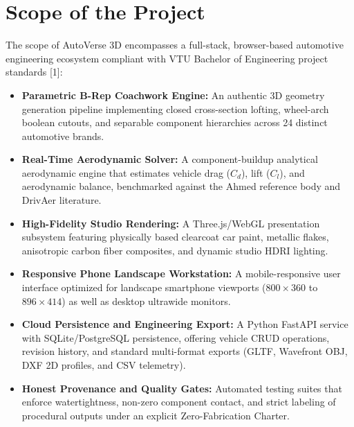 \documentclass[12pt,a4paper]{report}
\begin{document}
\section{Scope of the Project}
The scope of AutoVerse 3D encompasses a full-stack, browser-based automotive engineering ecosystem compliant with VTU Bachelor of Engineering project standards [1]:
\begin{itemize}
    \item \textbf{Parametric B-Rep Coachwork Engine:} An authentic 3D geometry generation pipeline implementing closed cross-section lofting, wheel-arch boolean cutouts, and separable component hierarchies across 24 distinct automotive brands.
    \item \textbf{Real-Time Aerodynamic Solver:} A component-buildup analytical aerodynamic engine that estimates vehicle drag ($C_d$), lift ($C_l$), and aerodynamic balance, benchmarked against the Ahmed reference body and DrivAer literature.
    \item \textbf{High-Fidelity Studio Rendering:} A Three.js/WebGL presentation subsystem featuring physically based clearcoat car paint, metallic flakes, anisotropic carbon fiber composites, and dynamic studio HDRI lighting.
    \item \textbf{Responsive Phone Landscape Workstation:} A mobile-responsive user interface optimized for landscape smartphone viewports ($800\times360$ to $896\times414$) as well as desktop ultrawide monitors.
    \item \textbf{Cloud Persistence and Engineering Export:} A Python FastAPI service with SQLite/PostgreSQL persistence, offering vehicle CRUD operations, revision history, and standard multi-format exports (GLTF, Wavefront OBJ, DXF 2D profiles, and CSV telemetry).
    \item \textbf{Honest Provenance and Quality Gates:} Automated testing suites that enforce watertightness, non-zero component contact, and strict labeling of procedural outputs under an explicit Zero-Fabrication Charter.
\end{itemize}
\end{document}

